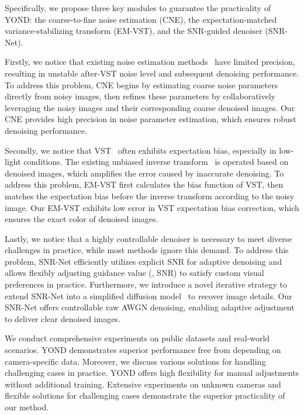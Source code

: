 \documentclass[lettersize,journal]{IEEEtran}
\begin{document}
	Specifically, we propose three key modules to guarantee the practicality of YOND: the coarse-to-fine noise estimation (CNE), the expectation-matched variance-stabilizing transform (EM-VST), and the SNR-guided denoiser (SNR-Net).
	
	Firstly, we notice that existing noise estimation methods~\cite{P-G,2013ICIP/Liu,CVPR21/FBI} have limited precision, resulting in unstable after-VST noise level and subsequent denoising performance. To address this problem, CNE begins by estimating coarse noise parameters directly from noisy images, then refines these parameters by collaboratively leveraging the noisy images and their corresponding coarse denoised images. Our CNE provides high precision in noise parameter estimation, which ensures robust denoising performance.
	
	Secondly, we notice that VST~\cite{ANSCOMBE,GAT,TIP11/VST} often exhibits expectation bias, especially in low-light conditions. The existing unbiased inverse transform~\cite{TIP11/O-VST,PGD-VST12,TIP13/VST} is operated based on denoised images, which amplifies the error caused by inaccurate denoising. To address this problem, EM-VST first calculates the bias function of VST, then matches the expectation bias before the inverse transform according to the noisy image. Our EM-VST exhibits low error in VST expectation bias correction, which ensures the exact color of denoised images.
	
	Lastly, we notice that a highly controllable denoiser \cite{CVPR19/DNI,CVPR19/AdaFM,ECCV20/CResMD,PR24/CFMNet} is necessary to meet diverse challenges in practice, while most methods ignore this demand. To address this problem, SNR-Net efficiently utilizes explicit SNR for adaptive denoising and allows flexibly adjusting guidance value (\ie, SNR) to satisfy custom visual preferences in practice. Furthermore, we introduce a novel iterative strategy to extend SNR-Net into a simplified diffusion model~\cite{NIPS20/DDPM,ICLR21/DDIM,DMID} to recover image details. Our SNR-Net offers controllable raw AWGN denoising, enabling adaptive adjustment to deliver clear denoised images.
	
	We conduct comprehensive experiments on public datasets and real-world scenarios. YOND demonstrates superior performance free from depending on camera-specific data.
	Moreover, we discuss various solutions for handling challenging cases in practice. YOND offers high flexibility for manual adjustments without additional training.
	Extensive experiments on unknown cameras and flexible solutions for challenging cases demonstrate the superior practicality of our method.
	
\end{document}
